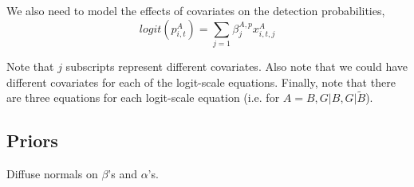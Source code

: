 \documentclass{article}
\begin{document}
We also need to model the effects of covariates on the detection
probabilities,
\begin{equation}
  logit(p_{i, t}^A) = \sum_{j=1} \beta_j^{A,p} x_{i, t, j}^A
\end{equation}

Note that $j$ subscripts represent different covariates.  Also note
that we could have different covariates for each of the logit-scale
equations.  Finally, note that there are three equations for each
logit-scale equation (i.e. for $A = B, G|B, G|\tilde{B}$).

\subsection{Priors}

Diffuse normals on $\beta$'s and $\alpha$'s.
\end{document}
